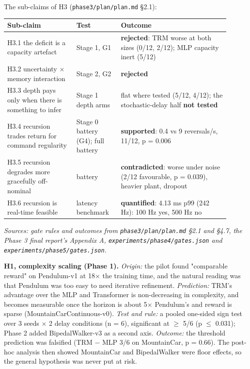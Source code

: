 \documentclass[11pt]{article}
\begin{document}
The sub-claims of H3 (\texttt{phase3/\allowbreak{}plan/\allowbreak{}plan.\allowbreak{}md} \S{}2.1):



\begin{center}\small\begin{tabular}{>{\raggedright\arraybackslash}p{0.281\linewidth}>{\raggedright\arraybackslash}p{0.180\linewidth}>{\raggedright\arraybackslash}p{0.445\linewidth}}
\toprule
Sub-claim & Test & Outcome \\
\midrule
H3.1 the deficit is a capacity artefact & Stage 1, G1 & \textbf{rejected}: TRM worse at both sizes (0/12, 2/12); MLP capacity inert (5/12) \\
H3.2 uncertainty $\times$ memory interaction & Stage 2, G2 & \textbf{rejected} \\
H3.3 depth pays only when there is something to infer & Stage 1 depth arms & flat where tested (5/12, 4/12); the stochastic-delay half \textbf{not tested} \\
H3.4 recursion trades return for command regularity & Stage 0 battery (G4); full battery & \textbf{supported}: 0.4 vs 9 reversals/s, 11/12, p = 0.006 \\
H3.5 recursion degrades more gracefully off-nominal & battery & \textbf{contradicted}: worse under noise (2/12 favourable, p = 0.039), heavier plant, dropout \\
H3.6 recursion is real-time feasible & latency benchmark & \textbf{quantified}: 4.13 ms p99 (242 Hz): 100 Hz yes, 500 Hz no \\
\bottomrule
\end{tabular}\end{center}



\emph{Sources: gate rules and outcomes from \texttt{phase3/\allowbreak{}plan/\allowbreak{}plan.\allowbreak{}md} \S{}2.1 and \S{}4.7, the Phase 3 final report's Appendix A, \texttt{experiments/\allowbreak{}phase4/\allowbreak{}gates.\allowbreak{}json} and \texttt{experiments/\allowbreak{}phase5/\allowbreak{}gates.\allowbreak{}json}.}



\textbf{H1, complexity scaling (Phase 1).} \emph{Origin:} the pilot found "comparable reward" on Pendulum-v1 at 18$\times$ the training time, and the natural reading was that Pendulum was too easy to need iterative refinement. \emph{Prediction:} TRM's advantage over the MLP and Transformer is non-decreasing in complexity, and becomes measurable once the horizon is about 5$\times$ Pendulum's and reward is sparse (MountainCarContinuous-v0). \emph{Test and rule:} a pooled one-sided sign test over 3 seeds $\times$ 2 delay conditions (n = 6), significant at $\geq$ 5/6 (p $\leq$ 0.031); Phase 2 added BipedalWalker-v3 as a second axis. \emph{Outcome:} the threshold prediction was falsified (TRM $-$ MLP 3/6 on MountainCar, p = 0.66). The post-hoc analysis then showed MountainCar and BipedalWalker were floor effects, so the general hypothesis was never put at risk.
\end{document}

